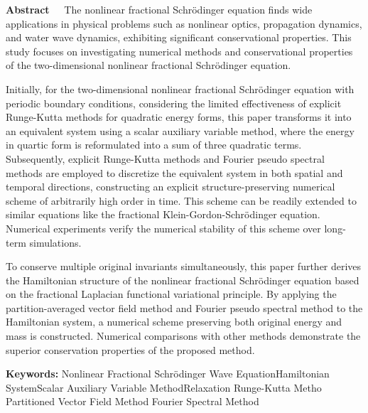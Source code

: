 \begin{EnglishAbstract}
\item {\bf Abstract\ \ } 
The nonlinear fractional Schr{\"o}dinger equation finds wide applications in physical problems such as nonlinear optics, propagation dynamics, and water wave dynamics, exhibiting significant conservational properties. This study focuses on investigating numerical methods and conservational properties of the two-dimensional nonlinear fractional Schr{\"o}dinger equation.

Initially, for the two-dimensional nonlinear fractional Schr{\"o}dinger equation with periodic boundary conditions, considering the limited effectiveness of explicit Runge-Kutta methods for quadratic energy forms, this paper transforms it into an equivalent system using a scalar auxiliary variable method, where the energy in quartic form is reformulated into a sum of three quadratic terms. Subsequently, explicit Runge-Kutta methods and Fourier pseudo spectral methods are employed to discretize the equivalent system in both spatial and temporal directions, constructing an explicit structure-preserving numerical scheme of arbitrarily high order in time. This scheme can be readily extended to similar equations like the fractional Klein-Gordon-Schr{\"o}dinger equation. Numerical experiments verify the numerical stability of this scheme over long-term simulations.

To conserve multiple original invariants simultaneously, this paper further derives the Hamiltonian structure of the nonlinear fractional Schr{\"o}dinger equation based on the fractional Laplacian functional variational principle. By applying the partition-averaged vector field method and Fourier pseudo spectral method to the Hamiltonian system, a numerical scheme preserving both original energy and mass is constructed. Numerical comparisons with other methods demonstrate the superior conservation properties of the proposed method.
\item {\bf Keywords:} Nonlinear Fractional Schr{\"o}dinger Wave Equation\qquad Hamiltonian System\qquad Scalar Auxiliary Variable Method\qquad Relaxation Runge-Kutta Metho \qquad Partitioned Vector Field Method \qquad Fourier Spectral Method
\end{EnglishAbstract}